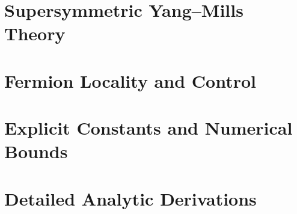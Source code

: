 \documentclass[11pt,a4paper]{report}
\begin{document}
\chapter{Supersymmetric Yang--Mills Theory}
\label{ch:susy}






\chapter{Fermion Locality and Control}
\label{ch:fermions}




\chapter{Explicit Constants and Numerical Bounds}
\label{ch:constants}






\chapter{Detailed Analytic Derivations}
\label{ch:hard-analysis}






\end{document}
